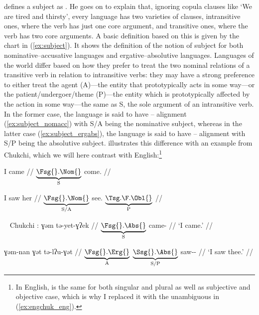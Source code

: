 \citet{dixon2010a} defines a subject as . He goes on to explain that,
ignoring copula clauses like `We are tired and thirsty', every language has two
varieties of clauses, intransitive ones, where the verb has just one core
argument, and transitive ones, where the verb has two core arguments. A basic
definition based on this is given by the chart in (\ref{ex:subject}). It shows
the definition of the notion of subject for both nominative--accusative
languages and ergative--absolutive languages. Languages of the world differ
based on how they prefer to treat the two nominal relations of a transitive
verb in relation to intransitive verbs: they may have a strong preference to
either treat the agent (A)---the entity that prototypically acts in some
way---or the patient/undergoer/theme (P)---the entity which is prototypically
affected by the action in some way---the same as S, the sole argument of an
intransitive verb. In the former case, the language is said to have
\Nom{}--\Acc{} alignment (\ref{ex:subject_nomacc}) with S/A being the
nominative subject, whereas in the latter case (\ref{ex:subject_ergabs}), the
language is said to have \Erg{}--\Abs{} alignment with S/P being the absolutive
subject. \citet{comrie1989} illustrates this difference with an example from
Chukchi, which we will here contrast with English:\footnote{In English,
 is the same for both singular and plural as well as subjective and
objective case, which is why I replaced it with the unambiguous
 in (\ref{ex:engchuk_eng}).}

%
\pex\label{ex:engchuk_eng}
\a\label{ex:engchuk_eng1}\begingl
	\gla I came //
	\glb $\underbrace{\text{\Fsg{}.\Nom{}}}_{\text{S}}$
		come.\Pst{} //
\endgl

\a\label{ex:engchuk_eng2}\begingl
	\gla I saw her //
	\glb $\underbrace{\text{\Fsg{}.\Nom{}}}_{\text{S/A}}$
		see.\Pst{}
		$\underbrace{\text{\TsgF{}.\Obl{}}}_{\text{P}}$
		//
\endgl

\xe

%
\pex~\label{ex:engchuk_chuk}%
Chukchi \parencite[adapted from][104]{comrie1989}:
\a\label{ex:engchuk_chuk1}\begingl
	\gla ɣəm tə-yet-ɣʔek //
	\glb $\underbrace{\text{\Fsg{}.\Abs{}}}_{\text{S}}$
		came-\Fsg{} //
	\glft `I came.' //
\endgl

\a\label{ex:engchuk_chuk2}\begingl
	\gla ɣəm-nan ɣət tə-lʔu-ɣət //
	\glb $\underbrace{\text{\Fsg{}.\Erg{}}}_{\text{A}}$
		$\underbrace{\text{\Ssg{}.\Abs{}}}_{\text{S/P}}$
		saw-\Fsg{}-\Ssg{} //
	\glft `I saw thee.' //
\endgl

